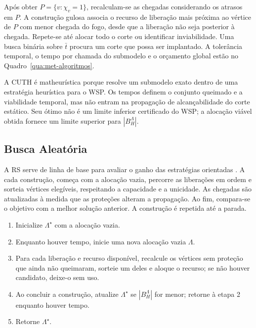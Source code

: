Após obter $P=\{v:\chi_v=1\}$, recalculam-se as chegadas considerando
os atrasos em $P$. A construção gulosa associa o recurso de liberação
mais próxima ao vértice de $P$ com menor chegada do fogo, desde que a
liberação não seja posterior à chegada. Repete-se até alocar todo o corte
ou identificar inviabilidade. Uma busca binária sobre $\bar t$ procura um
corte que possa ser implantado. A tolerância temporal, o tempo por chamada
do submodelo e o orçamento global estão no Quadro~\ref{qua:met-algoritmos}.

A CUTH é matheurística porque resolve um submodelo exato dentro de uma
estratégia heurística para o WSP. Os tempos definem o conjunto queimado
e a viabilidade temporal, mas não entram na propagação de alcançabilidade
do corte estático. Seu ótimo não é um limite inferior certificado do WSP;
a alocação viável obtida fornece um limite superior para $|B_H^{\Lambda}|$.

\subsection{Busca Aleatória}\label{sec:rs}

A RS serve de linha de base para avaliar o ganho das estratégias orientadas
\cite{DelazeriRitt2026}. A cada construção, começa com a alocação vazia,
percorre as liberações em ordem e sorteia vértices elegíveis, respeitando
a capacidade e a unicidade. As chegadas são atualizadas à medida que as
proteções alteram a propagação. Ao fim, compara-se o objetivo com a melhor
solução anterior. A construção é repetida até a parada.

\begin{quadro}[htbp]
\centering
\caption{Pseudocódigo da RS como linha de base de desempenho.}
\label{qua:pseudo-rs}
\begin{minipage}{0.95\textwidth}
\begin{singlespace}
\begin{enumerate}
 \item Inicialize $\Lambda^\star$ com a alocação vazia.
 \item Enquanto houver tempo, inicie uma nova alocação vazia $\Lambda$.
 \item Para cada liberação e recurso disponível, recalcule os vértices sem proteção que ainda não queimaram, sorteie um deles e aloque o recurso; se não houver candidato, deixe-o sem uso.
 \item Ao concluir a construção, atualize $\Lambda^\star$ se $|B_H^{\Lambda}|$ for menor; retorne à etapa 2 enquanto houver tempo.
 \item Retorne $\Lambda^\star$.
\end{enumerate}
{}
\end{singlespace}
\end{minipage}
\end{quadro}

